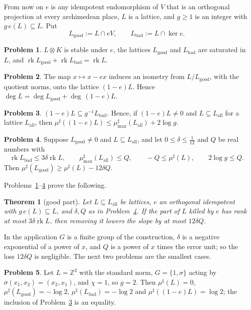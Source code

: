 \documentclass[reqno]{amsart}
\theoremstyle{definition}
\newtheorem{problem}{Problem}[section]
\theoremstyle{plain}
\newtheorem{theorem}{Theorem}[section]
\theoremstyle{remark}
\newcommand{\Z}{\mathbb Z}
\newcommand{\rk}{\operatorname{rk}}
\newcommand{\mus}{\mu^\sharp}
\newcommand{\musmax}{\mu^\sharp_{\max}}
\newcommand{\Lg}{L_{\mathrm{good}}}
\newcommand{\Lb}{L_{\mathrm{bad}}}
\newcommand{\La}{L_{\mathrm{all}}}
\begin{document}
From now on \(e\) is any idempotent endomorphism of \(V\) that is an orthogonal projection at every archimedean place, \(L\) is a lattice, and \(g \ge 1\) is an integer with \(g\,e(L) \subseteq L\).  Put
\[
  \Lg := L \cap eV , \qquad \Lb := L \cap \ker e .
\]

\begin{problem}\label{pr:split}
\(L \otimes K\) is stable under \(e\), the lattices \(\Lg\) and \(\Lb\) are saturated in \(L\), and \(\rk\Lg + \rk\Lb = \rk L\).
\end{problem}

\begin{problem}\label{pr:quotient}
The map \(x \mapsto x - ex\) induces an isometry from \(L/\Lg\), with the quotient norms, onto the lattice \((1-e)L\).  Hence \(\deg L = \deg\Lg + \deg\,(1-e)L\).
\end{problem}

\begin{problem}\label{pr:bad-slope}
\((1-e)L \subseteq g^{-1}\Lb\).  Hence, if \((1-e)L \ne 0\) and \(L \subseteq \La\) for a lattice \(\La\), then \(\mus((1-e)L) \le \musmax(\La) + 2\log g\).
\end{problem}

\begin{problem}\label{pr:good-slope}
Suppose \(\Lg \ne 0\) and \(L \subseteq \La\), and let \(0 \le \delta \le \frac1{12}\) and \(Q\) be real numbers with
\[
  \rk\Lb \le 3\delta\rk L ,\qquad \musmax(\La) \le Q ,\qquad -Q \le \mus(L) ,\qquad 2\log g \le Q .
\]
Then \(\mus(\Lg) \ge \mus(L) - 12\delta Q\).
\end{problem}

Problems~\ref{pr:split}--\ref{pr:good-slope} prove the following.

\begin{theorem}[good part]\label{thm:good}
Let \(L \subseteq \La\) be lattices, \(e\) an orthogonal idempotent with \(g\,e(L) \subseteq L\), and \(\delta, Q\) as in Problem~\ref{pr:good-slope}.  If the part of \(L\) killed by \(e\) has rank at most \(3\delta\rk L\), then removing it lowers the slope by at most \(12\delta Q\).
\end{theorem}

In the application \(G\) is a finite group of the construction, \(\delta\) is a negative exponential of a power of \(x\), and \(Q\) is a power of \(x\) times the error unit; so the loss \(12\delta Q\) is negligible.  The next two problems are the smallest cases.

\begin{problem}\label{pr:Z2}
Let \(L = \Z^2\) with the standard norm, \(G = \{1, \sigma\}\) acting by \(\sigma(x_1, x_2) = (x_2, x_1)\), and \(\chi = 1\), so \(g = 2\).  Then \(\mus(L) = 0\), \(\mus(\Lg) = -\log 2\), \(\mus(\Lb) = -\log 2\) and \(\mus((1-e)L) = \log 2\); the inclusion of Problem~\ref{pr:bad-slope} is an equality.
\end{problem}
\end{document}
